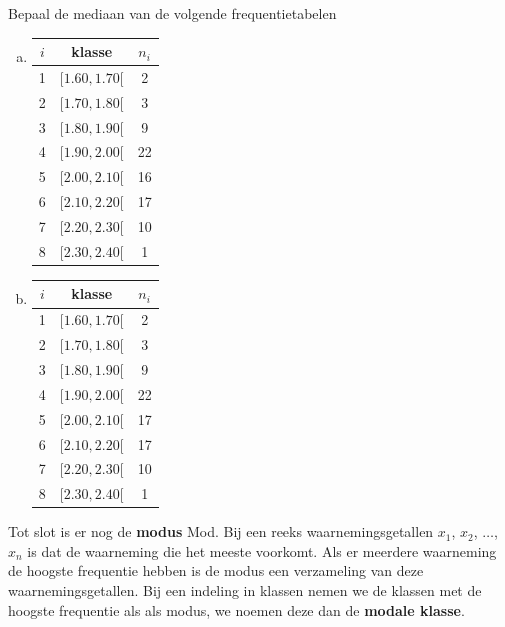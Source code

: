 \documentclass[12pt,twoside,a4paper]{article}
\begin{document}
\begin{oefening}
Bepaal de mediaan van de volgende frequentietabelen
\begin{multicols}{2}
\begin{enumerate}[(a)]
  \item
  \begin{center}
\begin{tabular}{c|c|c}
$i$ & klasse     & $n_i$\\
\hline
  1 & $[ 1.60,  1.70[$ &   2\\
  2 & $[ 1.70,  1.80[$ &   3\\
  3 & $[ 1.80,  1.90[$ &   9\\
  4 & $[ 1.90,  2.00[$ &   22\\
  5 & $[ 2.00,  2.10[$ &   16\\
  6 & $[ 2.10,  2.20[$ &   17\\
  7 & $[ 2.20,  2.30[$ &   10\\
  8 & $[ 2.30,  2.40[$ &   1\\
\end{tabular}
\end{center}
  \item
  \begin{center}
\begin{tabular}{c|c|c}
$i$ & klasse     & $n_i$\\
\hline
  1 & $[ 1.60,  1.70[$ &   2\\
  2 & $[ 1.70,  1.80[$ &   3\\
  3 & $[ 1.80,  1.90[$ &   9\\
  4 & $[ 1.90,  2.00[$ &   22\\
  5 & $[ 2.00,  2.10[$ &   17\\
  6 & $[ 2.10,  2.20[$ &   17\\
  7 & $[ 2.20,  2.30[$ &   10\\
  8 & $[ 2.30,  2.40[$ &   1\\
\end{tabular}
\end{center}
\end{enumerate}
\end{multicols}
\end{oefening}

Tot slot is er nog de {\bf modus} Mod. Bij een reeks waarnemingsgetallen $x_1$, $x_2$, $\ldots$, $x_n$ is dat de waarneming die het meeste voorkomt. Als er meerdere waarneming de hoogste frequentie hebben is de modus een verzameling van deze waarnemingsgetallen. Bij een indeling in klassen nemen we de klassen met de hoogste frequentie als als modus, we noemen deze dan de {\bf modale klasse}.
\end{document}
